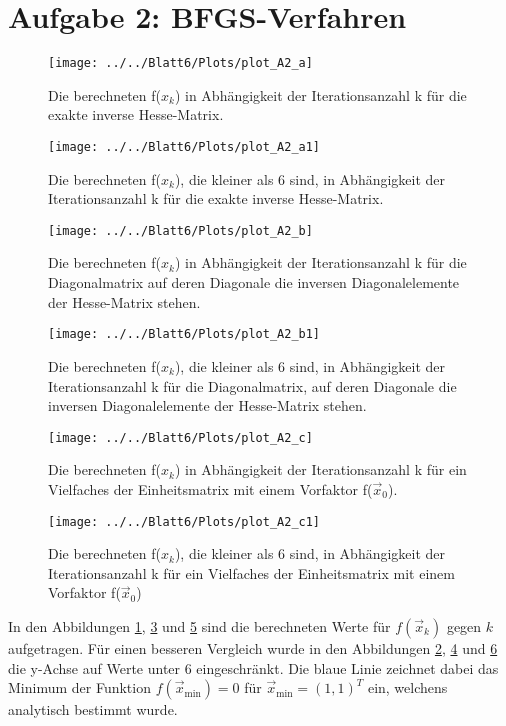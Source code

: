 \section*{Aufgabe 2: BFGS-Verfahren }


  \begin{figure}
    \centering
    \texttt{[image: ../../Blatt6/Plots/plot\_A2\_a]}
    \caption{Die berechneten f($x_k$) in Abhängigkeit der Iterationsanzahl k für die  exakte inverse Hesse-Matrix.}
    \label{fig:A2a1}
  \end{figure}
  \begin{figure}
    \centering
    \texttt{[image: ../../Blatt6/Plots/plot\_A2\_a1]}
    \caption{Die berechneten f($x_k$), die kleiner als 6 sind, in Abhängigkeit der Iterationsanzahl k für die  exakte inverse Hesse-Matrix.}
    \label{fig:A2a2}
  \end{figure}
  \begin{figure}
    \centering
    \texttt{[image: ../../Blatt6/Plots/plot\_A2\_b]}
    \caption{Die berechneten f($x_k$) in Abhängigkeit der Iterationsanzahl k für die Diagonalmatrix auf deren Diagonale die inversen Diagonalelemente der Hesse-Matrix stehen.}
    \label{fig:A2b1}
  \end{figure}
  \begin{figure}
    \centering
    \texttt{[image: ../../Blatt6/Plots/plot\_A2\_b1]}
    \caption{Die berechneten f($x_k$), die kleiner als 6 sind, in Abhängigkeit der Iterationsanzahl k für die Diagonalmatrix, auf deren Diagonale die inversen Diagonalelemente der Hesse-Matrix stehen.}
    \label{fig:A2b2}
  \end{figure}
  \begin{figure}
    \centering
    \texttt{[image: ../../Blatt6/Plots/plot\_A2\_c]}
    \caption{Die berechneten f($x_k$) in Abhängigkeit der Iterationsanzahl k für ein Vielfaches der Einheitsmatrix mit einem Vorfaktor f($\vec{x}_0$).}
    \label{fig:A2c1}
  \end{figure}
  \begin{figure}
    \centering
    \texttt{[image: ../../Blatt6/Plots/plot\_A2\_c1]}
    \caption{Die berechneten f($x_k$), die kleiner als 6 sind, in Abhängigkeit der Iterationsanzahl k für ein Vielfaches der Einheitsmatrix mit einem Vorfaktor f($\vec{x}_0$)}
    \label{fig:A2c2}
  \end{figure}

  In den Abbildungen \ref{fig:A2a1}, \ref{fig:A2b1} und \ref{fig:A2c1} sind die berechneten Werte für $f(\vec{x}_k)$ gegen $k$ aufgetragen. Für einen
  besseren Vergleich wurde in den Abbildungen \ref{fig:A2a2}, \ref{fig:A2b2} und \ref{fig:A2c2} die y-Achse auf Werte unter 6 eingeschränkt. Die blaue
  Linie zeichnet dabei das Minimum der Funktion $f(\vec{x}_\text{min})=0$ für $\vec{x}_\text{min}=(1,1)^T$ ein, welchens analytisch bestimmt wurde.

